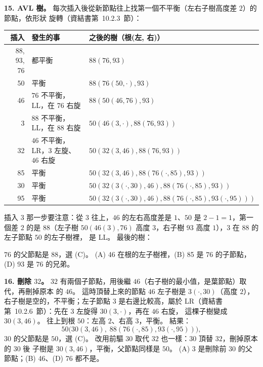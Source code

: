 \begin{pastsoln}
\textbf{15. AVL 樹。} 每次插入後從新節點往上找第一個不平衡（左右子樹高度差 $2$）的節點，依形狀
旋轉（資結書第~10.2.3~節）：
\begin{center}
\footnotesize\setlength{\tabcolsep}{4pt}
\begin{tabular}{rll}
\toprule
插入 & 發生的事 & 之後的樹（根(左, 右)） \\
\midrule
88, 93, 76 & 都平衡 & $88(76, 93)$ \\
50 & 平衡 & $88(76(50, \cdot), 93)$ \\
46 & $76$ 不平衡，LL，在 $76$ 右旋 & $88(50(46, 76), 93)$ \\
3 & $88$ 不平衡，LL，在 $88$ 右旋 & $50(46(3, \cdot), 88(76, 93))$ \\
32 & $46$ 不平衡，LR，$3$ 左旋、$46$ 右旋 & $50(32(3, 46), 88(76, 93))$ \\
85 & 平衡 & $50(32(3, 46), 88(76(\cdot, 85), 93))$ \\
30 & 平衡 & $50(32(3(\cdot, 30), 46), 88(76(\cdot, 85), 93))$ \\
95 & 平衡 & $50(32(3(\cdot, 30), 46), 88(76(\cdot, 85), 93(\cdot, 95)))$ \\
\bottomrule
\end{tabular}
\end{center}
插入 $3$ 那一步要注意：從 $3$ 往上，$46$ 的左右高度差是 $1$、$50$ 是 $2 - 1 = 1$，第一個差 $2$ 的是
$88$（左子樹 $50(46(3), 76)$ 高度 $3$，右子樹 $93$ 高度 $1$），$3$ 在 $88$ 的左子節點 $50$ 的左子樹裡，
是 LL。 最後的樹：
\begin{center}
\end{center}
$76$ 的父節點是 $88$，選 (C)。 (A) 46 在根的左子樹裡，(B) 85 是 $76$ 的子節點，(D) 93 是 $76$ 的兄弟。

\textbf{16. 刪除 $32$。} $32$ 有兩個子節點，用後繼 $46$（右子樹的最小值，是葉節點）取代，再刪掉原本
的 $46$。 這時頂替上來的節點 $46$ 左子樹是 $3(\cdot, 30)$（高度 $2$），右子樹是空的，不平衡；左子節點
$3$ 是右邊比較高，屬於 LR（資結書第~10.2.6~節）：先在 $3$ 左旋得 $30(3, \cdot)$，再在 $46$ 右旋，
這棵子樹變成 $30(3, 46)$。 往上到根 $50$：左高 $2$、右高 $3$，平衡。 結果：
\[
50\bigl(30(3, 46),\; 88(76(\cdot, 85), 93(\cdot, 95))\bigr),
\]
$30$ 的父節點是 $50$，選 (C)。 改用前驅 $30$ 取代 $32$ 也一樣：$30$ 頂替 $32$，刪掉原本的 $30$ 後
子樹是 $30(3, 46)$，平衡，父節點同樣是 $50$。 (A) 3 是刪除前 $30$ 的父節點；(B) 46、(D) 76 都不是。
\end{pastsoln}
